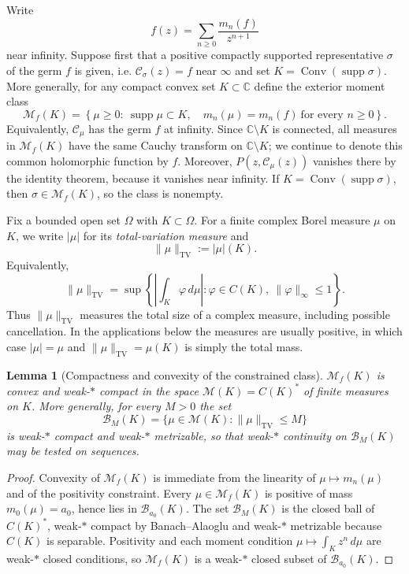 \documentclass[10pt,a4paper]{amsart}
\newtheorem{lemma}[theorem]{Lemma}
\newcommand{\bC}{\mathbb C}
\newcommand{\M}{\mathcal M}
\newcommand{\Cauchy}{\mathcal C}
\newcommand{\supp}{\operatorname{supp}}
\newcommand{\Conv}{\operatorname{Conv}}
\newcommand{\TV}{\mathrm{TV}}
\begin{document}
Write
\[
 f(z)=\sum_{n\ge0}\frac{m_n(f)}{z^{n+1}}
\]
near infinity.  Suppose first that a positive compactly supported representative
$\sigma$ of the germ $f$ is given, i.e. $\Cauchy_\sigma(z)=f$ near $\infty$ and set $K=\Conv(\supp\sigma)$.  More generally,
for any compact convex set $K\subset\bC$ define the exterior moment class
\begin{equation}\label{eq:moment-class}
 \M_f(K)=\left\{\mu\ge0:\ \supp\mu\subset K,\quad
 m_n(\mu)=m_n(f)\ \text{for every }n\ge0\right\}.
\end{equation}
Equivalently, $\Cauchy_\mu$ has the germ $f$ at infinity.  Since
$\bC\setminus K$ is connected, all measures in $\M_f(K)$ have the same Cauchy
transform on $\bC\setminus K$; we continue to denote this common holomorphic
function by $f$.  Moreover, $P(z,\Cauchy_\mu(z))$ vanishes there by the identity
theorem, because it vanishes near infinity.  If
$K=\Conv(\supp\sigma)$, then $\sigma\in\M_f(K)$, so the class is nonempty.

Fix a bounded open set $\Omega$ with $K\subset\Omega$.
 For a finite complex Borel measure $\mu$ on $K$, we write $|\mu|$ for its
\emph{total-variation measure} and
\begin{equation}\label{eq:TV-definition}
 \|\mu\|_{\TV}:=|\mu|(K).
\end{equation}
Equivalently,
\[
 \|\mu\|_{\TV}
 =\sup\left\{\left|\int_K\varphi\,d\mu\right|:
               \varphi\in C(K),\ \|\varphi\|_\infty\le1\right\}.
\]
Thus $\|\mu\|_{\TV}$ measures the total size of a complex measure, including
possible cancellation.  In the applications below the measures are usually
positive, in which case $|\mu|=\mu$ and $\|\mu\|_{\TV}=\mu(K)$ is simply the
total mass.

\begin{lemma}[Compactness and convexity of the constrained class]
\label{lem:compact-class}
$\M_f(K)$ is convex and weak-$*$ compact in the space $\M(K)=C(K)^*$ of finite
measures on $K$.  More generally, for every $M>0$ the set
\[
 \mathcal B_M(K)=\{\mu\in\M(K):\|\mu\|_{\TV}\leq M\}
\]
is weak-$*$ compact and weak-$*$ metrizable, so that weak-$*$ continuity on
$\mathcal B_M(K)$ may be tested on sequences.
\end{lemma}

\begin{proof}
Convexity of $\M_f(K)$ is immediate from the linearity of $\mu\mapsto m_n(\mu)$
and of the positivity constraint.  Every $\mu\in\M_f(K)$ is positive of mass
$m_0(\mu)=a_0$, hence lies in $\mathcal B_{a_0}(K)$.  The set
$\mathcal B_M(K)$ is the closed ball of $C(K)^*$, weak-$*$ compact by
Banach--Alaoglu and weak-$*$ metrizable because $C(K)$ is separable.  Positivity
and each moment condition $\mu\mapsto\int_Kz^n\,d\mu$ are weak-$*$ closed
conditions, so $\M_f(K)$ is a weak-$*$ closed subset of $\mathcal B_{a_0}(K)$.
\end{proof}
\end{document}
